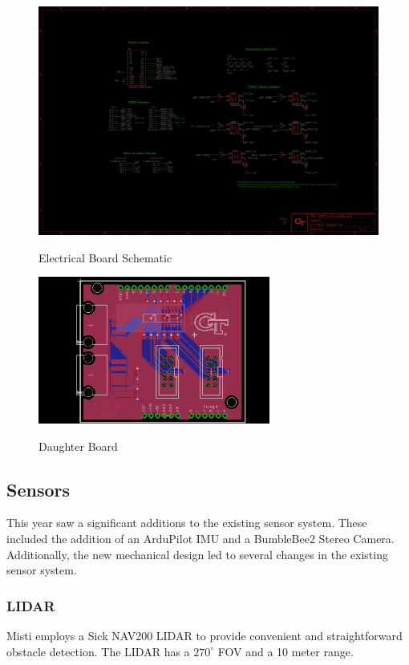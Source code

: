 \begin{figure}[H]
\begin{center}
\includegraphics[width=5in]{./Pics/schematisch.png}
\caption{Electrical Board Schematic}
\label{FIG:Schematic}
\includegraphics[width=3in]{./Pics/baord.png}
\caption{Daughter Board}
\label{FIG:Board}
\end{center}
\end{figure}


\subsection{Sensors}

This year saw a significant additions to the existing sensor system. These included the addition of an ArduPilot IMU and a BumbleBee2 Stereo Camera. Additionally, the new mechanical design led to several changes in the existing sensor system.

\subsubsection{LIDAR}

Misti employs a Sick NAV200 LIDAR to provide convenient and straightforward obstacle detection. The LIDAR has a $270^{\circ}$ FOV and a 10 meter range.

